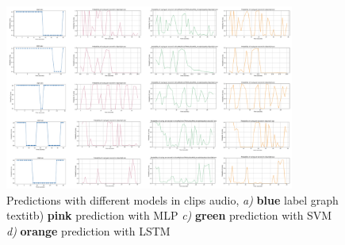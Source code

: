 \begin{figure}[h]
\centering
    \includegraphics[width=0.85\textwidth]{figures/clips.png}
\caption{Predictions with different models in clips audio, \textit{a)} \textbf{blue} label graph textit{b)} \textbf{pink} prediction with MLP \textit{c)} \textbf{green} prediction with SVM \textit{d)} \textbf{orange} prediction with LSTM}
\label{fig:clips0-4}
\end{figure}
















